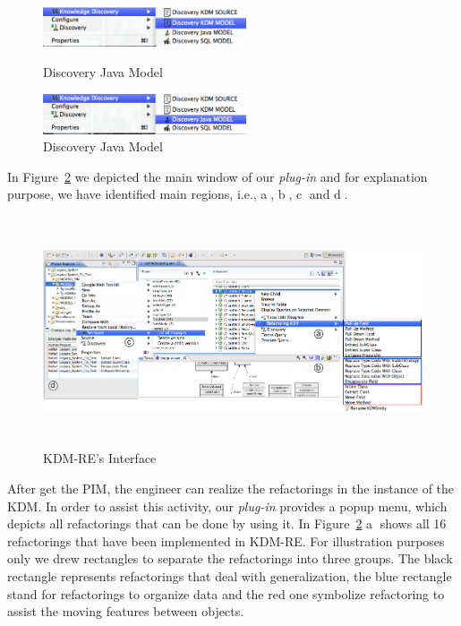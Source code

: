 \begin{figure}
\centering
\begin{minipage}{.5\textwidth}
  \centering
  \includegraphics[width=6cm]{figure/discovery_kdm_model}
  \caption{Discovery Java Model}
  \label{fig:discovery_java_model}
\end{minipage}%
\begin{minipage}{.5\textwidth}
  \centering
  \includegraphics[width=6cm]{figure/discovery_java_model}
  \caption{Discovery Java Model}
  \label{fig:discovery_kdm_model}
\end{minipage}
\end{figure}

In Figure~\ref{fig:interface} we depicted the main window of our \textit{plug-in} and for explanation purpose, we have identified main regions, i.e., \textcircled{a}, \textcircled{b}, \textcircled{c} and \textcircled{d}.

\begin{figure}[!ht]
\centering
  \includegraphics[width=15cm, height=6.8cm]{figure/ScreenShot_tool}
\caption{KDM-RE's Interface}
\label{fig:interface}
\end{figure}

After get the PIM, the engineer can realize the refactorings in the instance of the KDM. In order to assist this activity, our \textit{plug-in} provides a popup menu, which depicts all refactorings that can be done by using it. In Figure~\ref{fig:interface} \textcircled{a} shows all 16 refactorings that have been implemented in KDM-RE.  For illustration purposes only we drew rectangles to separate the refactorings into three groups. The black rectangle represents refactorings that deal with generalization, the blue rectangle stand for refactorings to organize data and the red one symbolize refactoring to assist the moving features between objects.




